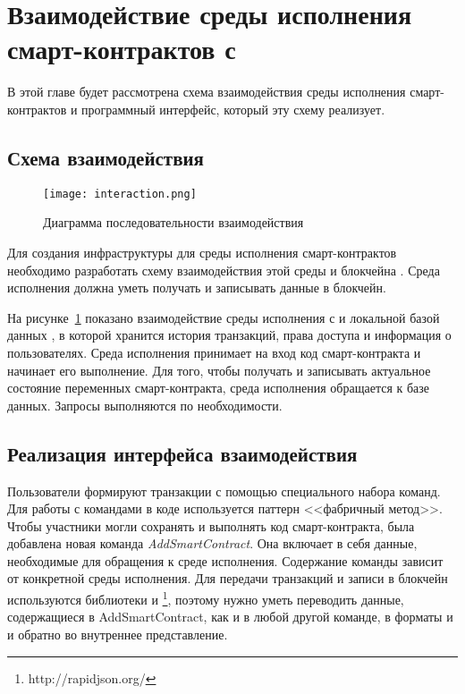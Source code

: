 \section{Взаимодействие среды исполнения смарт-кон\-трак\-тов с }
В этой главе будет рассмотрена схема взаимодействия среды исполнения смарт-контрактов и программный интерфейс, который эту схему реализует.

\subsection{Схема взаимодействия}
\label{Interaction}

\begin{figure}[b!]
  \centering
  \texttt{[image: interaction.png]}
  \caption{Диаграмма последовательности взаимодействия}
  \label{interaction}
\end{figure}

Для создания инфраструктуры для среды исполнения смарт-кон\-трак\-тов необходимо разработать схему взаимодействия этой среды и блокчейна .
Среда исполнения должна уметь получать и записывать данные в блокчейн.

На рисунке~\ref{interaction} показано взаимодействие среды исполнения с  и локальной базой данных , в которой хранится история транзакций, права доступа и информация о пользователях.
Среда исполнения принимает на вход код смарт-контракта и начинает его выполнение.
Для того, чтобы получать и записывать актуальное состояние переменных смарт-контракта, среда исполнения обращается к базе данных.
Запросы выполняются по необходимости.

\subsection{Реализация интерфейса взаимодействия}
\label{AddSmartContract}
Пользователи формируют транзакции с помощью специального набора команд.
Для работы с командами в коде используется паттерн <<фабричный метод>>.
Чтобы участники могли сохранять и выполнять код смарт-контракта, была добавлена новая команда \emph{Add\-Smart\-Con\-tract}.
Она включает в себя данные, необходимые для обращения к среде исполнения.
Содержание команды зависит от конкретной среды исполнения.
Для передачи транзакций и записи в блокчейн используются библиотеки  и \footnote{http://rapidjson.org/}, поэтому нужно уметь переводить данные, содержащиеся в AddSmartContract, как и в любой другой команде, в форматы  и  и обратно во внутреннее представление.

